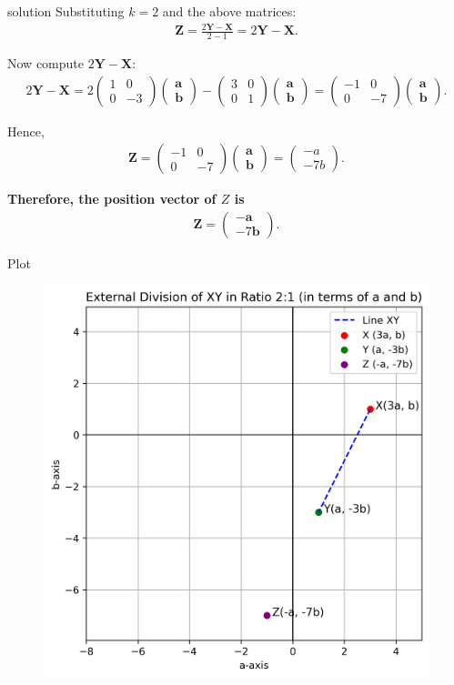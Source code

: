 \documentclass{beamer}
\numberwithin{equation}{section}
\theoremstyle{remark}
\newcommand{\myvec}[1]{\ensuremath{\begin{pmatrix}#1\end{pmatrix}}}
\let\vec\mathbf
\begin{document}
\begin{frame}{solution}
Substituting $k = 2$ and the above matrices:
\begin{align}
\vec{Z} = \frac{2\vec{Y} - \vec{X}}{2 - 1}
= 2\vec{Y} - \vec{X}.
\end{align}

Now compute $2\vec{Y} - \vec{X}$:
\begin{align}
2\vec{Y} - \vec{X} = 
2\myvec{1 & 0 \\ 
       0 & -3}
       \myvec{\vec{a} \\ \vec{b}}
-
\myvec{3 & 0 \\ 
      0 & 1}
      \myvec{\vec{a} \\ \vec{b}}
=
\myvec{-1 & 0 \\ 
     0 & -7}
     \myvec{\vec{a} \\ \vec{b}}.
\end{align}

Hence,
\begin{align}
\vec{Z} = 
\myvec{-1 & 0 \\ 
     0 & -7}
\myvec{\vec{a} \\ \vec{b}}
=
\myvec{-a \\ -7b}.
\end{align}

\noindent
\textbf{Therefore, the position vector of $Z$ is}
\begin{align}
\boxed{\mathbf{Z} = \myvec{-\vec{a} \\ -7\vec{b}}.}
\end{align}
\end{frame}
\begin{frame}{Plot}
    \begin{figure}[H]
    \centering
    \includegraphics[width=0.71\columnwidth]{figs/01.png}
    \label{fig-1}
\end{figure}
\end{frame}
\end{document}
